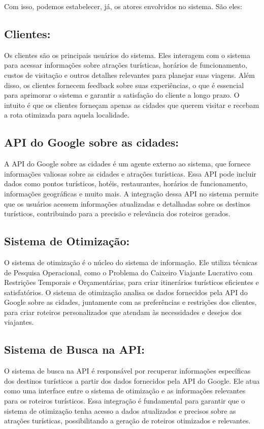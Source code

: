 Com isso, podemos estabelecer, já, os atores envolvidos no sistema. São eles:

\subsection{Clientes:} 
Os clientes são os principais usuários do sistema. Eles interagem com o sistema para acessar informações sobre atrações turísticas, horários de funcionamento, custos de visitação e outros detalhes relevantes para planejar suas viagens. Além disso, os clientes fornecem feedback sobre suas experiências, o que é essencial para aprimorar o sistema e garantir a satisfação do cliente a longo prazo. O intuito é que os clientes forneçam apenas as cidades que querem visitar e recebam a rota otimizada para aquela localidade.

\subsection{API do Google sobre as cidades:} 
A API do Google sobre as cidades é um agente externo ao sistema, que fornece informações valiosas sobre as cidades e atrações turísticas. Essa API pode incluir dados como pontos turísticos, hotéis, restaurantes, horários de funcionamento, informações geográficas e muito mais. A integração dessa API no sistema permite que os usuários acessem informações atualizadas e detalhadas sobre os destinos turísticos, contribuindo para a precisão e relevância dos roteiros gerados.

\subsection{Sistema de Otimização:} 
O sistema de otimização é o núcleo do sistema de informação. Ele utiliza técnicas de Pesquisa Operacional, como o Problema do Caixeiro Viajante Lucrativo com Restrições Temporais e Orçamentárias, para criar itinerários turísticos eficientes e satisfatórios. O sistema de otimização analisa os dados fornecidos pela API do Google sobre as cidades, juntamente com as preferências e restrições dos clientes, para criar roteiros personalizados que atendam às necessidades e desejos dos viajantes.

\subsection{Sistema de Busca na API:} 
O sistema de busca na API é responsável por recuperar informações específicas dos destinos turísticos a partir dos dados fornecidos pela API do Google. Ele atua como uma interface entre o sistema de otimização e as informações relevantes para os roteiros turísticos. Essa integração é fundamental para garantir que o sistema de otimização tenha acesso a dados atualizados e precisos sobre as atrações turísticas, possibilitando a geração de roteiros otimizados e relevantes.

